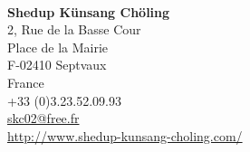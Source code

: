 
\pagestyle{empty}
\cleardoublepage
\
\cleardoublepage
\
\clearpage
\

\vfill

\begin{center}
\normalsize
\textbf{Shedup Künsang Chöling}\\
2, Rue de la Basse Cour\\
Place de la Mairie\\
F-02410 \quad Septvaux\\
France\\
\bigskip
+33 (0)3.23.52.09.93\\
\url{skc02@free.fr}\\
\url{http://www.shedup-kunsang-choling.com/}
\end{center}

